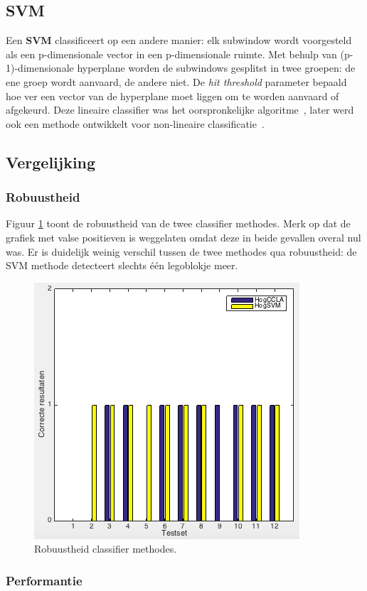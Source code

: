 \subsection{SVM} \label{sec:class_svm}
Een \textbf{SVM} classificeert op een andere manier: elk subwindow wordt voorgesteld als een p-dimensionale vector in een p-dimensionale ruimte. Met behulp van (p-1)-dimensionale hyperplane worden de subwindows gesplitst in twee groepen: de ene groep wordt aanvaard, de andere niet. De \textit{hit threshold} parameter bepaald hoe ver een vector van de hyperplane moet liggen om te worden aanvaard of afgekeurd. Deze lineaire classifier was het oorspronkelijke algoritme~\cite{vapnik1963pattern}, later werd ook een methode ontwikkelt voor non-lineaire classificatie~\cite{boser1992training}.

\subsection{Vergelijking}

\subsubsection*{Robuustheid}

Figuur \ref{fig:classRobuust} toont de robuustheid van de twee classifier methodes. Merk op dat de grafiek met valse positieven is weggelaten omdat deze in beide gevallen overal nul was. Er is duidelijk weinig verschil tussen de twee methodes qua robuustheid:  de SVM methode detecteert slechts \'e\'en legoblokje meer.

\begin{figure}
  \centering
  \includegraphics[width=0.5\linewidth]{img/ClassRobust}
  \caption{Robuustheid classifier methodes.}
  \label{fig:classRobuust}
\end{figure}

\subsubsection*{Performantie}

